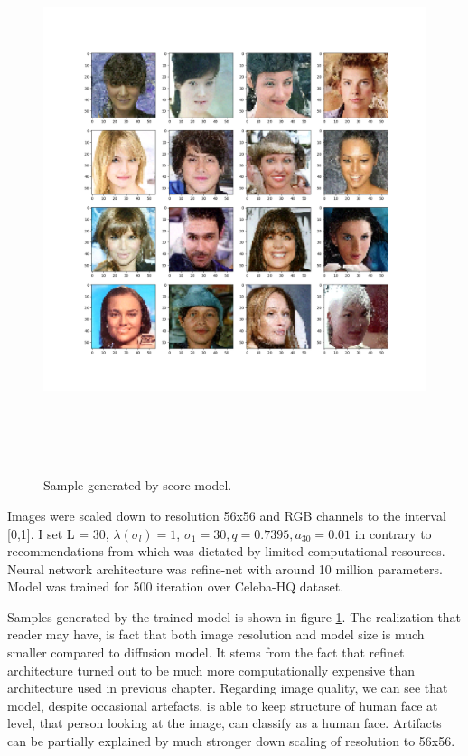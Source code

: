 \documentclass[10pt]{article}
\begin{document}
\begin{figure}
    \centering
\hspace*{-2cm}  
    \includegraphics[width = 16cm, height = 16cm]{score_model_500.png}
    \caption{Sample generated by score model.}
    \label{fig:score_example}
\end{figure}
Images were scaled down to resolution 56x56 and RGB channels to the interval [0,1].
I set L = 30,  $\lambda(\sigma_l) = 1$,  $\sigma_1 = 30,  q =  0.7395,  a_{30} = 0.01 $ in contrary to recommendations from \cite{improved_score} which was dictated by limited computational resources. Neural network architecture was refine-net with around 10 million parameters. Model was trained for 500 iteration over  Celeba-HQ \cite{celeba_hq} dataset.

Samples generated by the trained model is shown in figure \ref{fig:score_example}. The realization that reader may have, is fact that both image resolution and model size is much smaller compared to diffusion model. It stems from the fact that refinet architecture turned out to be much more computationally expensive than architecture used in previous chapter. Regarding image quality, we can see that model, despite occasional artefacts, is able to keep structure of human face at level, that person looking at the image, can classify as  a human face. Artifacts can be partially explained by much stronger down scaling of resolution to 56x56.
\end{document}
